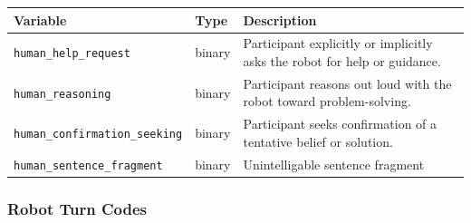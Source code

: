 \documentclass[
]{article}
\newcounter{none} %
\begin{document}
{\def\LTcaptype{none} %
\begin{longtable}[]{@{}
  >{\raggedright\arraybackslash}p{}
  >{\raggedright\arraybackslash}p{}
  >{\raggedright\arraybackslash}p{}@{}}
\toprule\noalign{}
\begin{minipage}[b]{\linewidth}\raggedright
Variable
\end{minipage} & \begin{minipage}[b]{\linewidth}\raggedright
Type
\end{minipage} & \begin{minipage}[b]{\linewidth}\raggedright
Description
\end{minipage} \\
\midrule\noalign{}
\endhead
\bottomrule\noalign{}
\endlastfoot
\texttt{human\_help\_request} & binary & Participant explicitly or
implicitly asks the robot for help or guidance. \\
\texttt{human\_reasoning} & binary & Participant reasons out loud with
the robot toward problem-solving. \\
\texttt{human\_confirmation\_seeking} & binary & Participant seeks
confirmation of a tentative belief or solution. \\
\texttt{human\_sentence\_fragment} & binary & Unintelligable sentence
fragment \\
\end{longtable}
}

\subsubsection*{Robot Turn Codes}\label{robot-turn-codes}
\end{document}
